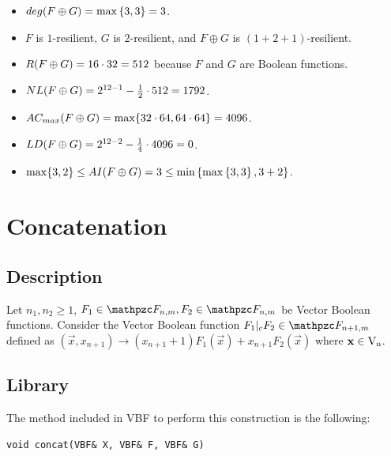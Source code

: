 \begin{example}
\begin{itemize}
\item $\crit{deg}(F \oplus G) = \max \left\{ 3, 3 \right\} = 3$.

\item $F$ is $1$-resilient, $G$ is $2$-resilient, and $F \oplus G$ is $(1+2+1)$-resilient.

\item $\crit{R}(F \oplus G) = 16 \cdot 32=512$ because $F$ and $G$ are Boolean functions.

\item $\crit{NL}(F \oplus G) = 2^{12-1} -\frac{1}{2} \cdot 512 = 1792$.

\item $\crit{AC_{max}}(F \oplus G) = \max \{ 32 \cdot 64, 64 \cdot 64 \} = 4096$.

\item $\crit{LD}(F \oplus G) =2^{12-2}-\frac{1}{4} \cdot 4096 = 0$.

\item $\max \{ 3, 2 \} \leq \crit{AI}(F \oplus G) = 3 \leq \min \left\{ \max \left\{ 3 , 3 \right\} ,  3 + 2 \right\}$.

\end{itemize}
\end{example}

\section{Concatenation}

\subsection{Description}

\begin{definition}
Let $n_1,n_2 \geq 1$, $F_1 \in \funct{F}_{n,m}, F_2 \in \funct{F}_{n,m}$ be Vector Boolean functions. Consider the Vector Boolean function $F_1 |_{c} F_2 \in \funct{F}_{n+1,m}$ defined as $(\vec{x},x_{n+1}) \rightarrow \left( x_{n+1}+1 \right) F_1(\vec{x})+ x_{n+1} F_2(\vec{x})$ where $\vec{x} \in \gf{V_n}$.
\end{definition}

\subsection{Library}

The method included in VBF to perform this construction is the following:

\begin{verbatim}
void concat(VBF& X, VBF& F, VBF& G)  
\end{verbatim}

